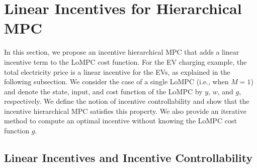 \section{Linear Incentives for Hierarchical MPC}
\label{sec:linear-incentives-for-hierarchical-mpc}

In this section, we propose an incentive hierarchical MPC that adds a linear incentive term to the LoMPC cost function.
For the EV charging example, the total electricity price is a linear incentive for the EVs, as explained in the following subsection.
We consider the case of a single LoMPC (i.e., when $M = 1$) and denote the state, input, and cost function of the LoMPC by $y$, $w$, and $g$, respectively.
We define the notion of incentive controllability and show that the incentive hierarchical MPC satisfies this property.
We also provide an iterative method to compute an optimal incentive without knowing the LoMPC cost function $g$.


\subsection{Linear Incentives and Incentive Controllability}
\label{subsec:linear-incentives-and-incentive-controllability}

